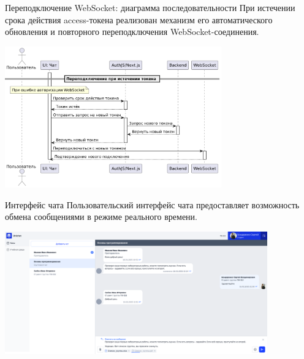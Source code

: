 \documentclass[aspectratio=169]{beamer}
\begin{document}
\begin{frame}{Переподключение WebSocket: диаграмма последовательности}
\small
\justifying
При истечении срока действия access-токена реализован механизм его автоматического обновления и повторного переподключения WebSocket-соединения.

\vspace{0.5em}

\centering
\includegraphics[width=0.7\textwidth]{static/WsReconnectSequence.png}
\end{frame}

\begin{frame}{Интерфейс чата}
\small
\justifying
Пользовательский интерфейс чата предоставляет возможность обмена сообщениями в режиме реального времени.

\vspace{1em}

\centering
\includegraphics[width=0.85\textwidth]{static/ChatsStudentPage.png}
\end{frame}

%
%
\end{document}
